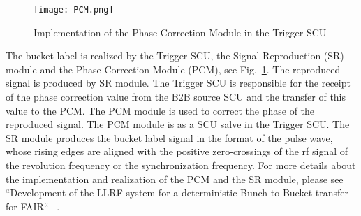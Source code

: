  \begin{figure}[!htb]
   \centering   
   \texttt{[image: PCM.png]}
   \caption{Implementation of the Phase Correction Module in the Trigger SCU}
   \label{PCM}
\end{figure}
The bucket label is realized by the Trigger SCU, the Signal Reproduction (SR) module and the Phase Correction Module (PCM), see Fig.~\ref{PCM}. The reproduced signal is produced by SR module. The Trigger SCU is responsible for the receipt of the phase correction value from the B2B source SCU and the transfer of this value to the PCM. The PCM module is used to correct the phase of the reproduced signal. The PCM module is as a SCU salve in the Trigger SCU. The SR module produces the bucket label signal in the format of the pulse wave, whose rising edges are aligned with the positive zero-crossings of the rf signal of the revolution frequency or the synchronization frequency. For more details about the implementation and realization of the PCM and the SR module, please see ``Development of the LLRF system for a deterministic Bunch-to-Bucket transfer for FAIR`` ~\cite{ferrand_development_????}. 

